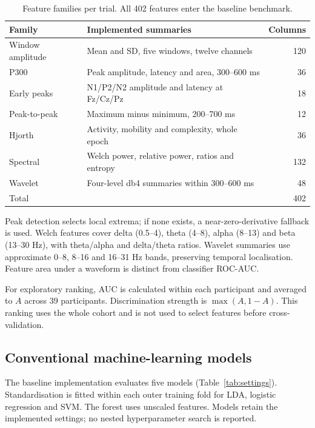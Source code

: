 \documentclass[11pt,a4paper]{article}
\begin{document}
\begin{table}[htbp]\centering
\small
\caption{Feature families per trial. All 402 features enter the baseline benchmark.}
\label{tab:families}
\begin{tabularx}{\linewidth}{lYr}
\toprule
Family & Implemented summaries & Columns\\\midrule
Window amplitude & Mean and SD, five windows, twelve channels & 120\\
P300 & Peak amplitude, latency and area, 300--600 ms & 36\\
Early peaks & N1/P2/N2 amplitude and latency at Fz/Cz/Pz & 18\\
Peak-to-peak & Maximum minus minimum, 200--700 ms & 12\\
Hjorth~\cite{hjorth} & Activity, mobility and complexity, whole epoch & 36\\
Spectral & Welch power, relative power, ratios and entropy & 132\\
Wavelet & Four-level db4 summaries within 300--600 ms & 48\\\midrule
Total & & 402\\\bottomrule
\end{tabularx}
\end{table}

Peak detection selects local extrema; if none exists, a near-zero-derivative fallback is used. Welch features cover delta (0.5--4), theta (4--8), alpha (8--13) and beta (13--30 Hz), with theta/alpha and delta/theta ratios. Wavelet summaries use approximate 0--8, 8--16 and 16--31 Hz bands, preserving temporal localisation. Feature area under a waveform is distinct from classifier ROC-AUC.

For exploratory ranking, AUC is calculated within each participant and averaged to $A$ across 39 participants. Discrimination strength is $\max(A,1-A)$. This ranking uses the whole cohort and is not used to select features before cross-validation.

\subsection{Conventional machine-learning models}
The baseline implementation evaluates five models (Table~\ref{tab:settings}). Standardisation is fitted within each outer training fold for LDA, logistic regression and SVM. The forest uses unscaled features. Models retain the implemented settings; no nested hyperparameter search is reported.
\end{document}
